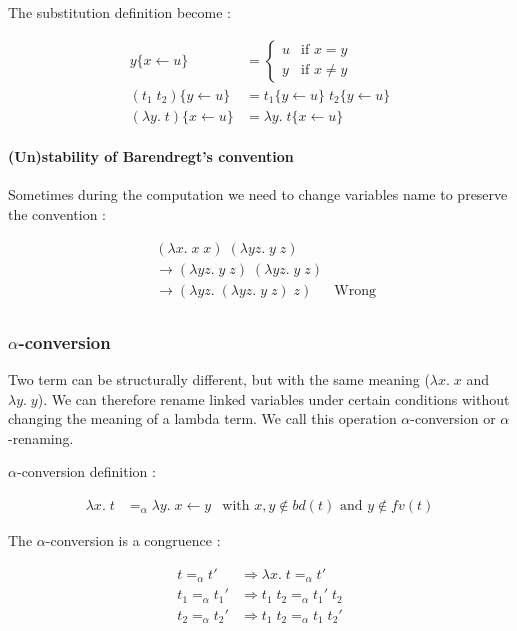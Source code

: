 \documentclass{article}
\theoremstyle{plain}
\theoremstyle{plain}
\begin{document}
  The substitution definition become :

  \begin{align*}
    y\{x \leftarrow u\} &= \begin{cases}
      u & \text{if } x = y \\
      y & \text{if } x \not = y
    \end{cases} \\
    (t_1\; t_2)\{y \leftarrow u\} &= t_1\{y \leftarrow u\}\; t_2\{y \leftarrow
    u\} \\
    (\lambda y.\;t)\{x \leftarrow u\} &= \lambda y.\; t\{x \leftarrow u\}
  \end{align*}

  \paragraph{(Un)stability of Barendregt's convention}
  Sometimes during the computation we need to change variables name to preserve
  the convention :

  \begin{align*}
    &(\lambda x.\;x\;x)\;(\lambda yz.\;y\;z)\\
    &\to (\lambda yz.\;y\;z)\;(\lambda yz.\;y\;z)\\
    &\to (\lambda yz.\;(\lambda yz.\;y\;z)\;z) & \text{Wrong}\\
  \end{align*}

  \subsubsection{$\alpha$-conversion}

  Two term can be structurally different, but with the same meaning ($\lambda
  x.\; x$ and $\lambda y.\; y$). We can therefore rename linked variables under
  certain conditions without changing the meaning of a lambda term. We call this
  operation $\alpha$-conversion or $\alpha$-renaming.

  $\alpha$-conversion definition :

  \begin{align*}
    \lambda x.\; t &=_\alpha \lambda y.\;{x \leftarrow y} & \text{with } x,y
      \not \in bd(t) \text{ and } y \not \in fv(t)
  \end{align*}

  The $\alpha$-conversion is a congruence :

  \begin{align*}
    t =_\alpha t' &\Rightarrow \lambda x.\;t =_\alpha t' \\
    t_1 =_\alpha t_1' &\Rightarrow t_1\;t_2 =_\alpha t_1'\;t_2 \\
    t_2 =_\alpha t_2' &\Rightarrow t_1\;t_2 =_\alpha t_1\;t_2' \\
  \end{align*}
\end{document}
